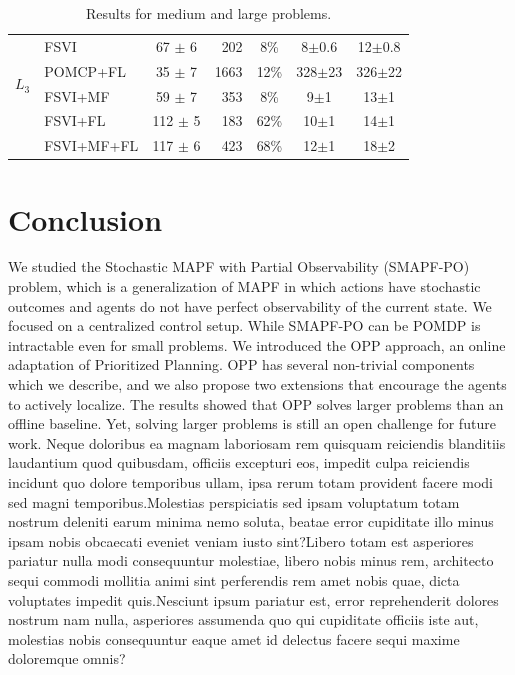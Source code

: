 \documentclass[letterpaper]{article} %
\newcommand{\itay}[1]{}
\begin{document}
\begin{table}
{\begin{tabular}{ |c|l|c|r|c|c|c| }
    \hline \hline
    \multirow{4}{*}{$L_3$}
    & FSVI\itay{+} & 67 $\pm$ 6 & 202 & 8\% & 8$\pm$0.6 & 12$\pm$0.8 \\
    & POMCP+FL\itay{+} & 35 $\pm$ 7 & 1663 & 12\% & 328$\pm$23 & 326$\pm$22 \\
    & FSVI+MF\itay{+} & 59 $\pm$ 7 & 353 & 8\% & 9$\pm$1 & 13$\pm$1 \\
    &FSVI+FL\itay{+} & 112 $\pm$ 5 & 183 & 62\% & 10$\pm$1 & 14$\pm$1 \\
    & FSVI+MF+FL\itay{+} & 117 $\pm$ 6 & 423 & 68\% & 12$\pm$1 & 18$\pm$2 \\
    \hline
    \end{tabular}
    }
    \caption{Results for medium and large problems.}%
    \label{tab:large-results}
\end{table}
\section{Conclusion}
We studied the Stochastic MAPF with Partial Observability (SMAPF-PO) problem, which is a generalization of MAPF in which actions have stochastic outcomes and agents do not have perfect observability of the current state. We focused on a centralized control setup. While SMAPF-PO can be  POMDP is intractable even for small problems.
We introduced the OPP approach, an online adaptation of Prioritized Planning. OPP has several non-trivial components which we describe, and we also propose two extensions that encourage the agents to actively localize. The results showed that OPP solves larger problems than an offline baseline.
Yet, solving larger problems is still an open challenge for future work.
Neque doloribus ea magnam laboriosam rem quisquam reiciendis blanditiis laudantium quod quibusdam, officiis excepturi eos, impedit culpa reiciendis incidunt quo dolore temporibus ullam, ipsa rerum totam provident facere modi sed magni temporibus.Molestias perspiciatis sed ipsam voluptatum totam nostrum deleniti earum minima nemo soluta, beatae error cupiditate illo minus ipsam nobis obcaecati eveniet veniam iusto sint?Libero totam est asperiores pariatur nulla modi consequuntur molestiae, libero nobis minus rem, architecto sequi commodi mollitia animi sint perferendis rem amet nobis quae, dicta voluptates impedit quis.Nesciunt ipsum pariatur est, error reprehenderit dolores nostrum nam nulla, asperiores assumenda quo qui cupiditate officiis iste aut, molestias nobis consequuntur eaque amet id delectus facere sequi maxime doloremque omnis?\clearpage

\end{document}
